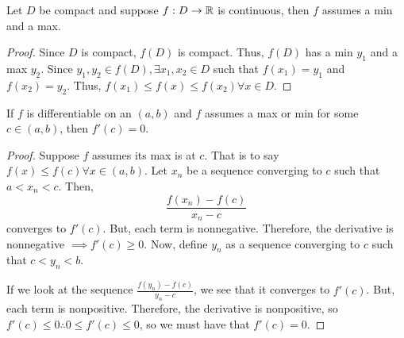 \begin{theorem}
    Let $D$ be compact and suppose $f: D \to \mathbb{R}$ is continuous, then $f$ assumes a min and a max.
\end{theorem}
\begin{proof}
    Since $D$ is compact, $f(D)$ is compact. Thus, $f(D)$ has a min $y_1$ and a max $y_2$. Since $y_1, y_2 \in f(D), \exists x_1, x_2 \in D$ such that $f(x_1) = y_1$ and $f(x_2) = y_2$. Thus, $f(x_1) \leq f(x) \leq f(x_2) \forall x \in D$.
\end{proof}

\begin{theorem}
    If $f$ is differentiable on an $(a, b)$ and $f$ assumes a max or min for some $c \in (a, b)$, then $f'(c) = 0$.
\end{theorem}
\begin{proof}
    Suppose $f$ assumes its max is at $c$. That is to say $f(x) \leq f(c) \forall x \in (a, b)$. Let $x_n$ be a sequence converging to $c$ such that $a < x_n < c$. Then, $$\frac{f(x_n) - f(c)}{x_n - c}$$ converges to $f'(c)$. But, each term is nonnegative. Therefore, the derivative is nonnegative $\implies f'(c) \geq 0$. Now, define $y_n$ as a sequence converging to $c$ such that $c < y_n < b$.

    If we look at the sequence $\frac{f(y_n) - f(c)}{y_n - c}$, we see that it converges to $f'(c)$. But, each term is nonpositive. Therefore, the derivative is nonpositive, so $f'(c) \leq 0 \therefore 0 \leq f'(c) \leq 0$, so we must have that $f'(c) = 0$.
\end{proof}